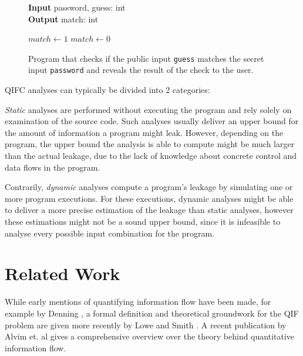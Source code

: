 \begin{figure}
\centering
\begin{minipage}{.7\linewidth}
    \begin{algorithm}[H]
        \hspace*{\algorithmicindent} \textbf{Input} password, guess: int \\
        \hspace*{\algorithmicindent} \textbf{Output} match: int
        \begin{algorithmic}[1]
                \State $match \leftarrow 1$
            \Else
                \State $match \leftarrow 0$
            \EndIf
    \end{algorithmic} 
    \end{algorithm}
    \end{minipage}
    \caption{Program that checks if the public input \texttt{guess} matches the secret input \texttt{password} and reveals the result of the check to the user.}
    \label{fig:pwChecker}
\end{figure}

QIFC analyses can typically be divided into 2 categories:

\emph{Static} analyses are performed without executing the program and rely solely on examination of the source code. Such analyses usually deliver an upper bound for the amount of information a program might leak. However, depending on the program, the upper bound the analysis is able to compute might be much larger than the actual leakage, due to the lack of knowledge about concrete control and data flows in the program.

Contrarily, \emph{dynamic} analyses compute a program's leakage by simulating one or more program executions. For these executions, dynamic analyses might be able to deliver a more precise estimation of the leakage than static analyses, however these estimations might not be a sound upper bound, since it is infeasible to analyse every possible input combination for the program.

\section{Related Work}\label{sec:relWork}

While early mentions of quantifying information flow have been made, for example by Denning \cite{denning82}, a formal definition and theoretical groundwork for the QIF problem are given more recently by Lowe \cite{lowe02} and Smith \cite{smith09}. A recent publication by Alvim et. al \cite{alvim19} gives a comprehensive overview over the theory behind quantitative information flow.

